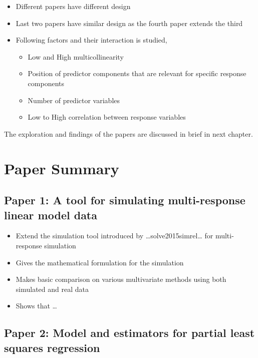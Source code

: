 \documentclass[11pt,twoside,openright,titlepage,
  headinclude,footinclude,BCOR=5mm,
  numbers=noenddot,cleardoublepage=empty,
  tablecaptionabove, dottedtoc,
  bibliography=totoc]{scrreprt}
\providecommand{\tightlist}{%
  \setlength{\itemsep}{0pt}\setlength{\parskip}{0pt}}
\begin{document}
\begin{itemize}
\tightlist
\item
  Different papers have different design
\item
  Last two papers have similar design as the fourth paper extends the third
\item
  Following factors and their interaction is studied,

  \begin{itemize}
  \tightlist
  \item
    Low and High multicollinearity
  \item
    Position of predictor components that are relevant for specific response components
  \item
    Number of predictor variables
  \item
    Low to High correlation between response variables
  \end{itemize}
\end{itemize}

The exploration and findings of the papers are discussed in brief in next chapter.

\hypertarget{paper-summary}{%
\chapter{Paper Summary}\label{paper-summary}}

\hypertarget{paper-1-a-tool-for-simulating-multi-response-linear-model-data}{%
\section{Paper 1: A tool for simulating multi-response linear model data}\label{paper-1-a-tool-for-simulating-multi-response-linear-model-data}}

\begin{itemize}
\tightlist
\item
  Extend the simulation tool introduced by \ldots{}solve2015simrel\ldots{} for multi-response simulation
\item
  Gives the mathematical formulation for the simulation
\item
  Makes basic comparison on various multivariate methods using both simulated and real data
\item
  Shows that \ldots{}
\end{itemize}

\hypertarget{paper-2-model-and-estimators-for-partial-least-squares-regression}{%
\section{Paper 2: Model and estimators for partial least squares regression}\label{paper-2-model-and-estimators-for-partial-least-squares-regression}}
\end{document}
